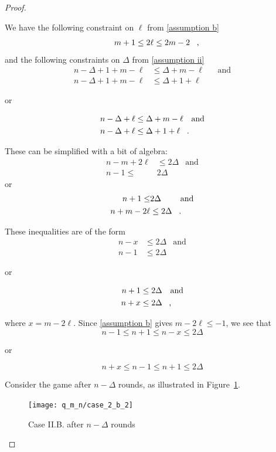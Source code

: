 \begin{proof}
\begin{proofpart}
\begin{itemize}
  We have the following constraint on $\ell$ from \ref{assumption b}
  \begin{align*}
   m + 1 \leq 2 \ell \leq 2m - 2 \mcomma
  \end{align*}
  and the following constraints on $\Delta$ from \ref{assumption ii}
  \begin{align*}
   n - \Delta + 1 + m - \ell &\leq \Delta + m - \ell && \text{and} \\
   n - \Delta + 1 + m - \ell &\leq \Delta + 1 + \ell
  \end{align*}
  \begin{center}or\end{center}
    \begin{align*}
     n - \Delta + \ell &\leq \Delta + m - \ell && \text{and} \\
     n - \Delta + \ell &\leq \Delta + 1 + \ell \mperiod
    \end{align*}

  These can be simplified with a bit of algebra:
  \begin{align*}
   n-m+2\ell &\leq 2 \Delta & \text{and} \\
   n-1 \leq       & 2\Delta
  \end{align*}
  or
  \begin{align*}
   n+1 \leq        & 2 \Delta & \text{and} \\
   n+m-2\ell  &\leq 2 \Delta \mperiod
  \end{align*}

  These inequalities are of the form
  \begin{align*}
   n-x &\leq 2 \Delta & \text{and} \\
   n-1 &\leq 2\Delta
  \end{align*}
  \begin{center}or\end{center}
  \begin{align*}
   n + 1 &\leq 2 \Delta & \text{and} \\
   n + x &\leq 2 \Delta \mcomma
  \end{align*}

  where $x = m -2\ell$. Since \ref{assumption b} gives $m - 2\ell \leq -1$, we
  see that
  \[ n-1 \leq n+1 \leq n-x \leq 2 \Delta \]
  \begin{center}or\end{center}
  \[ n+x \leq n-1 \leq n+1 \leq 2 \Delta \]

  Consider the game after $n-\Delta$ rounds, as illustrated in Figure~\ref{fig:case_2_b_2}.
  \begin{figure}
    \centering
    \texttt{[image: q\_m\_n/case\_2\_b\_2]}
    \caption{Case II.B. after $n-\Delta$ rounds \label{fig:case_2_b_2}}
  \end{figure}


\end{itemize}
\end{proofpart}
\end{proof}
